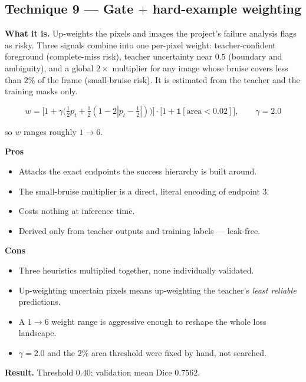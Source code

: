 \documentclass[11pt]{article}
\newcommand{\pro}[1]{\item[\textcolor{proscol}{$+$}] #1}
\newcommand{\con}[1]{\item[\textcolor{conscol}{$-$}] #1}
\begin{document}
\subsection{Technique 9 --- Gate $+$ hard-example weighting}

\textbf{What it is.} Up-weights the pixels and images the project's failure analysis flags as
risky. Three signals combine into one per-pixel weight: teacher-confident foreground
(complete-miss risk), teacher uncertainty near $0.5$ (boundary and ambiguity), and a global
$2\times$ multiplier for any image whose bruise covers less than $2\%$ of the frame (small-bruise
risk). It is estimated from the teacher and the training masks only.

\[
  w = \Big[1+\gamma\big(\tfrac12 p_t + \tfrac12(1-2|p_t-\tfrac12|)\big)\Big]
      \cdot\Big[1+\mathbf{1}[\text{area}<0.02]\Big],\qquad \gamma=2.0
\]

so $w$ ranges roughly $1\to6$.

\begin{minipage}[t]{0.475\textwidth}
\textbf{\textcolor{proscol}{Pros}}
\begin{itemize}[leftmargin=1.5em,itemsep=1pt,label={},labelwidth=1em,labelsep=0.4em,align=left]
  \pro{Attacks the exact endpoints the success hierarchy is built around.}
  \pro{The small-bruise multiplier is a direct, literal encoding of endpoint 3.}
  \pro{Costs nothing at inference time.}
  \pro{Derived only from teacher outputs and training labels --- leak-free.}
\end{itemize}
\end{minipage}\hfill%
\begin{minipage}[t]{0.475\textwidth}
\textbf{\textcolor{conscol}{Cons}}
\begin{itemize}[leftmargin=1.5em,itemsep=1pt,label={},labelwidth=1em,labelsep=0.4em,align=left]
  \con{Three heuristics multiplied together, none individually validated.}
  \con{Up-weighting uncertain pixels means up-weighting the teacher's \emph{least reliable}
       predictions.}
  \con{A $1\to6$ weight range is aggressive enough to reshape the whole loss landscape.}
  \con{$\gamma=2.0$ and the $2\%$ area threshold were fixed by hand, not searched.}
\end{itemize}
\end{minipage}

\vspace{6pt}
\textbf{Result.} Threshold $0.40$; validation mean Dice $0.7562$.
\end{document}
